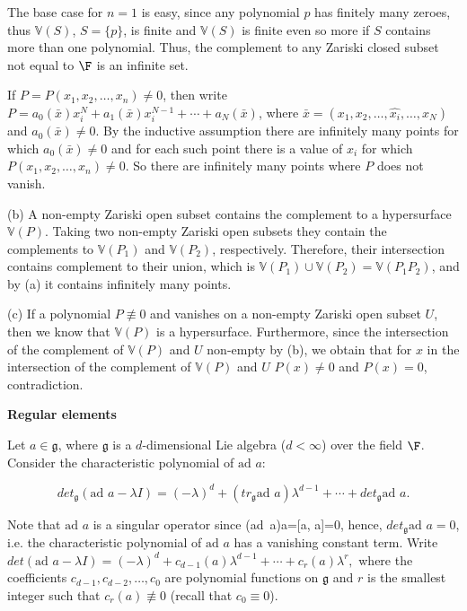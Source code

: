 \documentclass[11pt]{article}
\newcommand{\ad}{\mbox{ad\ }}
\newcommand{\g}{\mathfrak{g}}
\begin{document}
 The base case for $n=1$ is easy, since  any  polynomial $p$ has finitely many zeroes, thus $\mathbb{V}(S)$, $S=\{p\}$,  is finite and $\mathbb{V}(S)$ is finite even so more if $S$ contains more than one polynomial. Thus, the  complement to any Zariski closed subset not equal to $\F$ is an infinite set. 


If $P=P(x_1, x_2, \ldots, x_n) \neq 0$, then write $P=a_0(\bar{x})x^N_i+a_1(\bar{x})x^{N-1}_i+\cdots+a_N(\bar{x})$, where $\bar{x}=(x_1, x_2, \ldots, \hat{x_i}, \ldots, x_N)$ and $a_0(\bar{x})\neq 0$. By the inductive assumption there are infinitely many points for which $a_0(\bar{x})\neq 0$ and for each such point there is a value of $x_i$ for which $P(x_1, x_2, \ldots, x_n) \neq 0$. So there are infinitely many points where $P$ does not vanish. 

(b) A non-empty Zariski open subset contains the complement to a hypersurface $\mathbb{V}(P)$. Taking two non-empty Zariski open subsets they contain the complements to   $\mathbb{V}(P_1)$ and 
$\mathbb{V}(P_2)$, respectively. Therefore, their intersection contains complement to their union, which is $\mathbb{V}(P_1) \cup \mathbb{V}(P_2)=
\mathbb{V}(P_1 P_2)$, and by (a) it contains infinitely many points. 


(c) If a polynomial $P\not \equiv 0$ and vanishes on a non-empty Zariski open subset $U$, then we know that  $\mathbb{V}(P)$ is a hypersurface. Furthermore,   since  
  the intersection of the complement of $\mathbb{V}(P)$ and $U$  non-empty by (b), we obtain that for $x$ in the  intersection of the complement of $\mathbb{V}(P)$ and $U$  $P(x)\neq 0$ and $P(x)=0$, contradiction.



\begin{center}
{\large \bf Regular elements}
\end{center}


Let $a \in \g$, where $\g$ is a $d$-dimensional Lie algebra ($d<\infty$)  over the field $\F$. Consider the characteristic polynomial of $\ad a$: 

$$det_{\g}(\ad a-\lambda I)=(-\lambda)^d+(tr_{\g} \ad a) \lambda^{d-1}+\cdots+det_{\g} \ad a.$$

Note that $\ad a $ is a singular operator since (\ad a)a=[a, a]=0, hence, $det_{\g}\ad a=0$, i.e.  the characteristic polynomial of $\ad a$ has a vanishing constant term. Write $det(\ad a-\lambda I)=(-\lambda)^d+c_{d-1}(a) \lambda^{d-1}+\cdots+c_{r}(a) \lambda^{r},$ where the coefficients $c_{d-1}, c_{d-2}, \ldots, c_0$ are polynomial functions on $\g$ and $r$ is the smallest integer such that $c_r(a)\not \equiv 0$ (recall that $c_0\equiv 0$).
\end{document}
